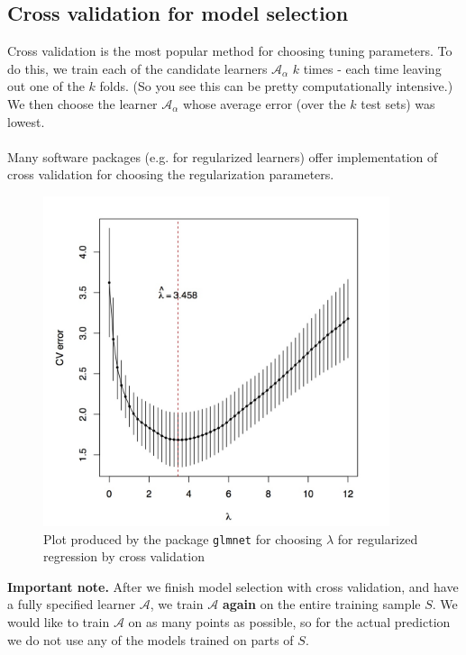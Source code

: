 \documentclass[11pt]{article}
\newcommand{\Ac}{\mathcal{A}}
\begin{document}
  \subsection{Cross validation for model selection}
  Cross validation is the most popular method for choosing tuning parameters.
  To do this, we train each of the candidate learners $\Ac_\alpha$ $k$ times -
  each time leaving out one of the $k$ folds. (So you see this can be pretty
  computationally intensive.) We then choose the learner $\Ac_\alpha$ whose
  average error (over the $k$ test sets) was lowest.
\\~\\
  Many software packages (e.g. for regularized learners) offer implementation of cross
  validation for choosing the regularization parameters.

  
  \begin{figure}[H]
    \centering
  \includegraphics[width=4in]{cv_lambda.jpeg}  
      \caption{Plot produced by the package {\tt glmnet} for choosing $\lambda$
      for regularized regression by cross validation}
  \end{figure}

  {\bf Important note.} After we finish model selection with cross validation,
  and have a fully specified learner $\Ac$, we train $\Ac$ {\bf again} on the
  entire training sample $S$. We would like to train $\Ac$ on as many points as
  possible, so for the actual prediction we do not use any of the models trained
  on parts of $S$.
\end{document}
